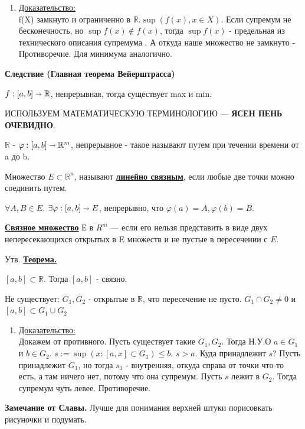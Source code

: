 \documentclass{article}
\newcommand{\deff}[1]{\underline{\textbf{#1}}}
\newcommand{\thmm}[1]{\underline{\textbf{#1}}}
\newcommand{\prooff}[1]{{\underline{Доказательство:}} \\ }
\begin{document}
\begin{enumerate}
    \item[] \prooff{}
    f(X) замкнуто и ограниченно в $\mathbb{R}$.$\sup(f(x),x\in X)$. Если супремум не бесконечность, но $\sup f(x) \notin f(x)$, тогда $\sup f(x)$ - предельная из технического описания супремума . А откуда наше множество не замкнуто - Противоречие. Для минимума аналогично.
\end{enumerate}

\textbf{Следствие (Главная теорема Вейерштрасса)}

$f: [a,b]\shortrightarrow \mathbb{R}$, непрерывная, тогда существует max и min. 

ИСПОЛЬЗУЕМ МАТЕМАТИЧЕСКУЮ ТЕРМИНОЛОГИЮ --- \textbf{ЯСЕН ПЕНЬ ОЧЕВИДНО}.




$\mathbb{R}$ - $\varphi: [a,b] \shortrightarrow \mathbb{R}^m$, непрерывное - такое называют путем при течении времени от a до b.

Множество $E \subset \mathbb{R}^n$,  называют \deff{линейно связным}, если любые две точки можно соединить путем.

$\forall A, B \in E$. $\exists \varphi: [a,b] \shortrightarrow E $, непрерывно, что $\varphi(a)= A, \varphi(b) = B$.

\deff{Связное множество} Е в $R^m$ ---  если его нельзя представить в виде двух непересекающихся открытых в E множеств и не пустые в пересечении с $E$.

Утв. \thmm{Теорема.}

$[a,b] \subset \mathbb{R}$. Тогда $[a,b]$ - связно. 

Не существует: $G_1,G_2$ - открытые в $\mathbb{R}$, что пересечение не пусто. $G_1 \cap G_2 \neq 0$ и $[a,b] \subset G_1 \cup  G_2  $

\begin{enumerate}
    \item[] \prooff{}
    Докажем от противного. Пусть существует такие $G_1,G_2$. Тогда Н.У.О $a \in G_1$ и $b \in G_2$. $s:= \sup(x: [a,x] \subset G_1) \leq b$. $s > a$.
    Куда принадлежит $s$? Пусть принадлежит $G_1$, но тогда $s_1$ - внутренняя, откуда справа от точки что-то есть, а там ничего нет, потому что она супремум. Пусть $s$ лежит в $G_2$. Тогда супремум чуть левее. Противоречие.
\end{enumerate}

\textbf{Замечание от Славы.} Лучше для понимания верхней штуки порисовкать рисуночки и подумать.
\end{document}
